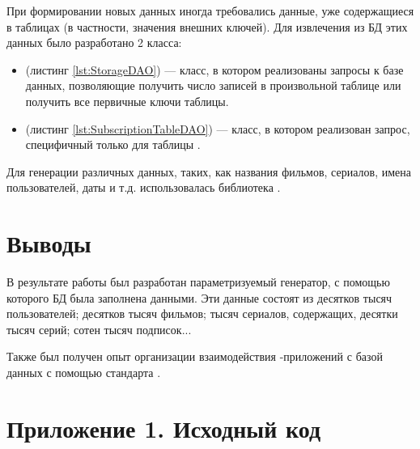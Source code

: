 \begin{enumerate}
	При формировании новых данных иногда требовались данные, уже содержащиеся в таблицах (в частности, значения внешних ключей). Для извлечения из БД этих данных было разработано 2 класса: 
	
	\begin{itemize}
		\item {} (листинг \ref{lst:StorageDAO}) --- класс, в котором реализованы  запросы к базе данных, позволяющие получить число записей в произвольной таблице или получить все первичные ключи таблицы.
		\item {} (листинг \ref{lst:SubscriptionTableDAO}) --- класс, в котором реализован  запрос, специфичный только для таблицы .
	\end{itemize}
	
	Для генерации различных данных, таких, как названия фильмов, сериалов, имена пользователей, даты и т.д. использовалась библиотека .
	
\end{enumerate}

\section{Выводы}

В результате работы был разработан параметризуемый генератор, с помощью которого БД была заполнена данными. Эти данные состоят из десятков тысяч пользователей; десятков тысяч фильмов; тысяч сериалов, содержащих, десятки тысяч серий; сотен тысяч подписок...

Также был получен опыт организации взаимодействия -приложений с базой данных с помощью стандарта .

\section*{Приложение 1. Исходный код}







